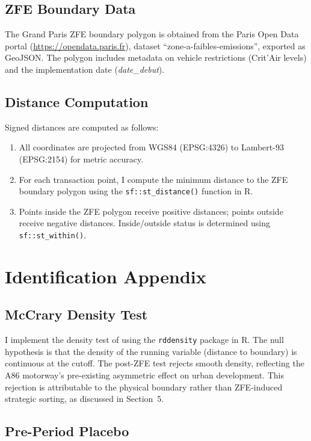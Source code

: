 \documentclass[12pt]{article}
\begin{document}
\subsection{ZFE Boundary Data}

The Grand Paris ZFE boundary polygon is obtained from the Paris Open Data portal (\url{https://opendata.paris.fr}), dataset ``zone-a-faibles-emissions'', exported as GeoJSON. The polygon includes metadata on vehicle restrictions (Crit'Air levels) and the implementation date (\textit{date\_debut}).

\subsection{Distance Computation}

Signed distances are computed as follows:
\begin{enumerate}
    \item All coordinates are projected from WGS84 (EPSG:4326) to Lambert-93 (EPSG:2154) for metric accuracy.
    \item For each transaction point, I compute the minimum distance to the ZFE boundary polygon using the \texttt{sf::st\_distance()} function in R.
    \item Points inside the ZFE polygon receive positive distances; points outside receive negative distances. Inside/outside status is determined using \texttt{sf::st\_within()}.
\end{enumerate}


\section{Identification Appendix}
\label{app:identification}

\subsection{McCrary Density Test}

I implement the density test of \citet{cattaneo2020density} using the \texttt{rddensity} package in R. The null hypothesis is that the density of the running variable (distance to boundary) is continuous at the cutoff. The post-ZFE test rejects smooth density, reflecting the A86 motorway's pre-existing asymmetric effect on urban development. This rejection is attributable to the physical boundary rather than ZFE-induced strategic sorting, as discussed in Section~5.

\subsection{Pre-Period Placebo}
\end{document}
